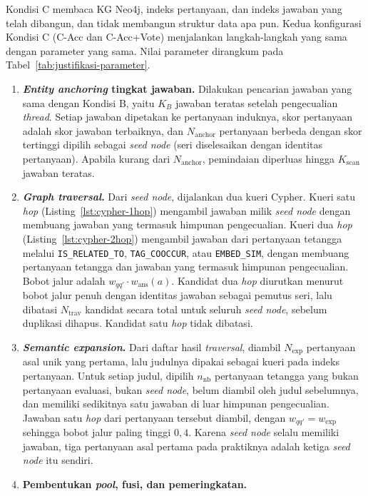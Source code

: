 Kondisi C membaca KG Neo4j, indeks pertanyaan, dan indeks jawaban yang telah dibangun, dan tidak membangun struktur data apa pun. Kedua konfigurasi Kondisi C (C-Acc dan C-Acc+Vote) menjalankan langkah-langkah yang sama dengan parameter yang sama. Nilai parameter dirangkum pada Tabel~\ref{tab:justifikasi-parameter}.
\begin{enumerate}
    \item \textbf{\emph{Entity anchoring} tingkat jawaban.} Dilakukan pencarian jawaban yang sama dengan Kondisi B, yaitu $K_B$ jawaban teratas setelah pengecualian \emph{thread}. Setiap jawaban dipetakan ke pertanyaan induknya, skor pertanyaan adalah skor jawaban terbaiknya, dan $N_{\mathrm{anchor}}$ pertanyaan berbeda dengan skor tertinggi dipilih sebagai \emph{seed node} (seri diselesaikan dengan identitas pertanyaan). Apabila kurang dari $N_{\mathrm{anchor}}$, pemindaian diperluas hingga $K_{\mathrm{scan}}$ jawaban teratas.
    \item \textbf{\emph{Graph traversal}.} Dari \emph{seed node}, dijalankan dua kueri Cypher. Kueri satu \emph{hop} (Listing~\ref{lst:cypher-1hop}) mengambil jawaban milik \emph{seed node} dengan membuang jawaban yang termasuk himpunan pengecualian. Kueri dua \emph{hop} (Listing~\ref{lst:cypher-2hop}) mengambil jawaban dari pertanyaan tetangga melalui \texttt{IS\_RELATED\_TO}, \texttt{TAG\_COOCCUR}, atau \texttt{EMBED\_SIM}, dengan membuang pertanyaan tetangga dan jawaban yang termasuk himpunan pengecualian. Bobot jalur adalah $w_{qq'}\cdot w_{\mathrm{ans}}(a)$. Kandidat dua \emph{hop} diurutkan menurut bobot jalur penuh dengan identitas jawaban sebagai pemutus seri, lalu dibatasi $N_{\mathrm{trav}}$ kandidat secara total untuk seluruh \emph{seed node}, sebelum duplikasi dihapus. Kandidat satu \emph{hop} tidak dibatasi.
    \item \textbf{\emph{Semantic expansion}.} Dari daftar hasil \emph{traversal}, diambil $N_{\mathrm{exp}}$ pertanyaan asal unik yang pertama, lalu judulnya dipakai sebagai kueri pada indeks pertanyaan. Untuk setiap judul, dipilih $n_{\mathrm{nb}}$ pertanyaan tetangga yang bukan pertanyaan evaluasi, bukan \emph{seed node}, belum diambil oleh judul sebelumnya, dan memiliki sedikitnya satu jawaban di luar himpunan pengecualian. Jawaban satu \emph{hop} dari pertanyaan tersebut diambil, dengan $w_{qq'}=w_{\mathrm{exp}}$ sehingga bobot jalur paling tinggi $0{,}4$. Karena \emph{seed node} selalu memiliki jawaban, tiga pertanyaan asal pertama pada praktiknya adalah ketiga \emph{seed node} itu sendiri.
    \item \textbf{Pembentukan \emph{pool}, fusi, dan pemeringkatan.}

\end{enumerate}
